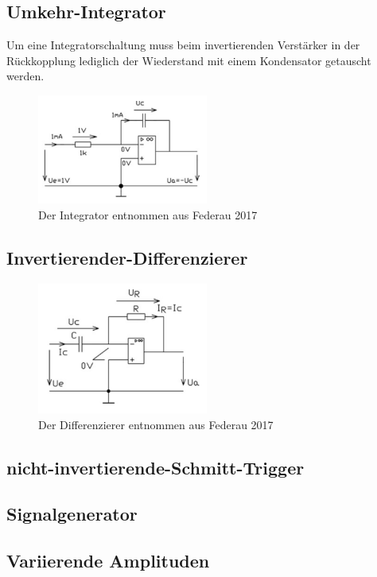     \subsection{Umkehr-Integrator}
        Um eine Integratorschaltung muss beim invertierenden Verstärker in der Rückkopplung lediglich der Wiederstand mit einem Kondensator getauscht werden.
        \begin{figure}[ht]
            \centering
            \includegraphics[width = 0.5\textwidth]{bilder/integrator.png}
            \caption{Der Integrator entnommen aus Federau 2017}
            \label{fig:integrator}
        \end{figure}
    \subsection{Invertierender-Differenzierer}
        \begin{figure}[ht]
            \centering
            \includegraphics[width = 0.5\textwidth]{bilder/differenzierer.png}
            \caption{Der Differenzierer entnommen aus Federau 2017}
            \label{fig:differenzierer}
        \end{figure}
    \subsection{nicht-invertierende-Schmitt-Trigger}
    \subsection{Signalgenerator}
    \subsection{Variierende Amplituden}